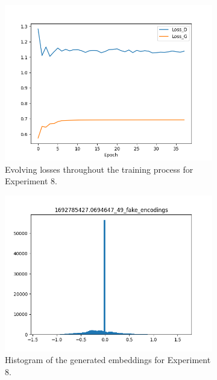 \begin{figure}[!ht]
    \centering
    \begin{subfigure}{0.3\textwidth}
        \includegraphics[width=\textwidth]{figures/4.5-results/exp8_loss.png}
        \caption{Evolving losses throughout the training process for Experiment 8.}
        \label{fig:exp8_loss}
    \end{subfigure}
    \begin{subfigure}{0.3\textwidth}
        \includegraphics[width=\textwidth]{figures/4.5-results/exp8_hist.png}
        \caption{Histogram of the generated embeddings for Experiment 8.}
        \label{fig:exp8_hist}
    \end{subfigure}
    \begin{subfigure}{0.3\textwidth}

\end{subfigure}
\end{figure}
